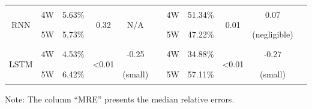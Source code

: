 \begin{landscape}
\begin{table}[htbp]
{\begin{tabular}{|c|c|c|c|c|c|c|c|c|c|c|}
    \multirow{2}[9]{*}{RNN} & \multirow{1}[5]{*}{4W}    & \multirow{1}[5]{*}{5.63\%} & \multirow{2}[9]{*}{0.32} & \multirow{2}[9]{*}{N/A} & \multirow{2}[4]{*}{\includegraphics[height=15mm,width=30mm]{openmrs_rnn.pdf}} & \multirow{1}[5]{*}{4W}    & \multirow{1}[5]{*}{51.34\%} & \multirow{2}[9]{*}{0.01} & \multirow{1}[10]{*}{0.07} & \multirow{2}[4]{*}{\includegraphics[height=15mm,width=30mm]{jms_rnn.pdf}} \\[4.5mm]
\cline{2-3}\cline{7-8}          & \multirow{1}[5]{*}{5W}    & \multirow{1}[5]{*}{5.73\%} &       &       &       & \multirow{1}[5]{*}{5W}    & \multirow{1}[5]{*}{47.22\%} &       & (negligible) &  \\[4.5mm]
    \hline
    \multirow{2}[9]{*}{LSTM} & \multirow{1}[5]{*}{4W}    &\multirow{1}[5]{*}{ 4.53\%} & \multirow{2}[9]{*}{\textless 0.01} & \multirow{1}[10]{*}{-0.25} & \multirow{2}[4]{*}{\includegraphics[height=15mm,width=30mm]{openmrs_lstm.pdf}} & \multirow{1}[5]{*}{4W}    & \multirow{1}[5]{*}{34.88\%} & \multirow{2}[9]{*}{\textless 0.01} & \multirow{1}[10]{*}{-0.27} & \multirow{2}[4]{*}{\includegraphics[height=15mm,width=30mm]{jms_lstm.pdf}} \\[4.5mm]
\cline{2-3}\cline{7-8}          & \multirow{1}[5]{*}{5W}    & \multirow{1}[5]{*}{6.42\%} &       & (small) &       & \multirow{1}[5]{*}{5W}    & \multirow{1}[5]{*}{57.11\%} &       & (small) &  \\[4.5mm]
    \hline
    \end{tabular}}
    Note: The column ``MRE'' presents the median relative errors.\hfill
  \label{tab:model_error}%
\end{table}%
\end{landscape}


